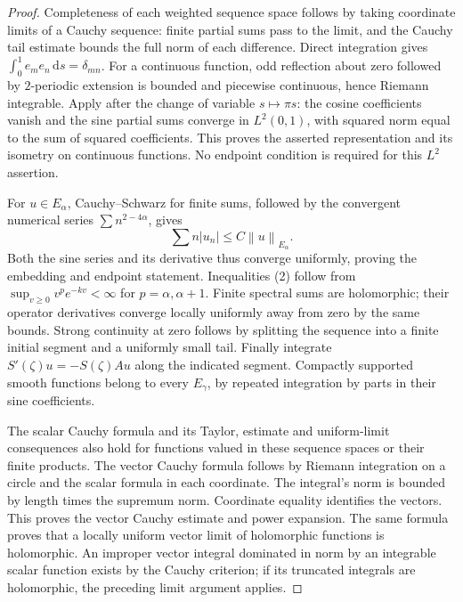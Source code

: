 \documentclass[11pt]{article}
\newcommand{\dd}{\,\mathrm d}
\newcommand{\norm}[1]{\left\lVert#1\right\rVert}
\begin{document}
\begin{proof}
Completeness of each weighted sequence space follows by taking coordinate
limits of a Cauchy sequence: finite partial sums pass to the limit, and
the Cauchy tail estimate bounds the full norm of each difference.
Direct integration gives $\int_0^1e_me_n\dd s=\delta_{mn}$.
For a continuous function, odd reflection about zero followed by
$2$-periodic extension is bounded and piecewise continuous, hence
Riemann integrable. Apply \cite[Theorem 11.8.13]{RA} after the change of variable $s\mapsto\pi s$:
the cosine coefficients vanish and the sine partial sums converge in
$L^2(0,1)$, with squared norm equal to the sum of squared coefficients.
This proves the asserted representation and its isometry on continuous
functions. No endpoint condition is required for this $L^2$ assertion.

For $u\in E_\alpha$, Cauchy--Schwarz for finite sums, followed by the
convergent numerical series $\sum n^{2-4\alpha}$, gives
\[
 \sum n|u_n|\le C\norm{u}_{E_\alpha}.
\]
Both the sine series and its derivative thus converge uniformly, proving
the embedding and endpoint statement. Inequalities (2) follow from
$\sup_{v\ge0}v^p e^{-kv}<\infty$ for $p=\alpha,\alpha+1$.
Finite spectral sums are holomorphic; their operator derivatives converge
locally uniformly away from zero by the same bounds. Strong continuity
at zero follows by splitting the sequence into a finite initial segment
and a uniformly small tail. Finally integrate
$S'(\zeta)u=-S(\zeta)Au$ along the indicated segment.
Compactly supported smooth functions belong to every $E_\gamma$,
by repeated integration by parts in their sine coefficients.

The scalar Cauchy formula and its Taylor, estimate and uniform-limit
consequences \cite[Theorems 3.2.15, 3.3.1, 3.3.8 and 3.4.5]{CA}
also hold for functions valued in these sequence spaces or
their finite products. The vector Cauchy formula follows by Riemann
integration on a circle and the scalar formula in each coordinate.
The integral's norm is bounded by length times the supremum norm.
Coordinate equality identifies the vectors. This proves the vector
Cauchy estimate and power expansion. The same formula proves that a
locally uniform vector limit of holomorphic functions is holomorphic.
An improper vector integral dominated in norm by an integrable scalar
function exists by the Cauchy criterion; if its truncated integrals are
holomorphic, the preceding limit argument applies.
\end{proof}
\end{document}
